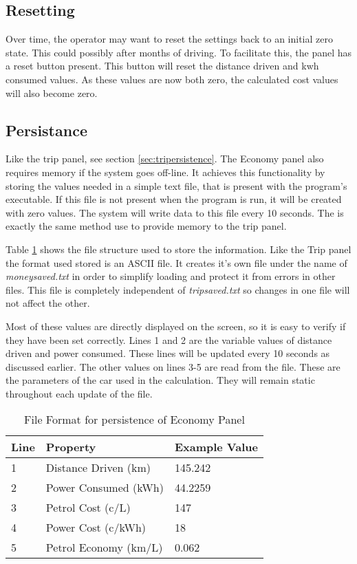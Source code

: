 \subsection{Resetting}

Over time, the operator may want to reset the settings back to an initial zero state. This could possibly after months of driving. To facilitate this, the panel has a reset button present. This button will reset the distance driven and kwh consumed values. As these values are now both zero, the calculated cost values will also become zero.

\subsection{Persistance}

Like the trip panel, see section \ref{sec:tripersistence}. The Economy panel also requires memory if the system goes off-line.  It achieves this functionality by storing the values needed in a simple text file, that is present with the program's executable. If this file is not present when the program is run, it will be created with zero values. The system will write data to this file every 10 seconds. The is exactly the same method use to provide memory to the trip panel.

Table \ref{tab:economyformat} shows the file structure used to store the information. Like the Trip panel the format used  stored is an ASCII file.  It creates it's own file under the name of \emph{moneysaved.txt} in order to simplify loading and protect it from errors in other files. This file is completely independent of \emph{tripsaved.txt} so changes in one file will not affect the other.

Most of these values are directly displayed on the screen, so it is easy to verify if they have been set correctly. Lines 1 and 2 are the variable values of distance driven and power consumed. These lines will be updated every 10 seconds as discussed earlier. The other values on lines 3-5 are read from the file. These are the parameters of the car used in the calculation. They will remain static throughout each update of the file.

\begin{table}
\begin{center}
    \begin{tabular}{|l|l|l|}
        \hline
        Line & Property              & Example Value \\ \hline
        1    & Distance Driven (km)  & 145.242       \\ 
        2    & Power Consumed (kWh)  & 44.2259       \\ 
        3    & Petrol Cost (c/L)     & 147           \\ 
        4    & Power Cost (c/kWh)    & 18            \\ 
        5    & Petrol Economy (km/L) & 0.062         \\
        \hline
    \end{tabular}
	\caption{File Format for persistence of Economy Panel}
	\label{tab:economyformat}
\end{center}
\end{table}




